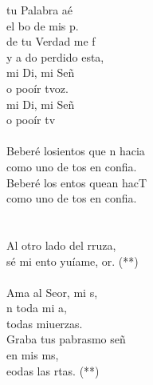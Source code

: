 \begin{cancion}[Hacia Ti][Ixcís]%
	tu Palabra aé\\
	el bo de mis p.\\
	de tu Verdad me f\\
	y a do perdido esta,\\
	mi Di, mi Señ\\
	o pooír tvoz.\\
	mi Di, mi Señ\\
	o pooír tv \\
\jump\\
	Beberé losientos que n hacia\\
	como uno de tos en  confia.\\
	Beberé los entos quean hacT\\
	como uno de tos en  confia.\\
\jump\\
	      \chord{(}{**)}{    }\\
	Al otro lado del rruza,\\
	sé mi ento yuíame, or. (**) \\
\jump\\
	Ama al Seor, mi s, \\
	n toda mi a, \\
	 todas miuerzas.\\
	Graba tus pabrasmo señ  \\
	en mis ms, \\
	eodas las rtas. (**)\\
\jump\\
	      \chord{(}{**)}{    }\\
\end{cancion}%
